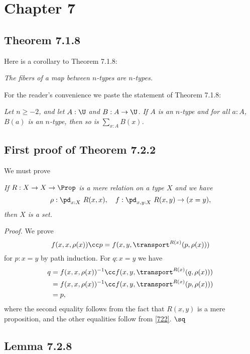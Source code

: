 \documentclass[12pt]{article}
\begin{document}

\section{Chapter 7}

\subsection{Theorem 7.1.8}\label{718}

Here is a corollary to Theorem 7.1.8: 

\emph{The fibers of a map between $n$-types are $n$-types.}

For the reader's convenience we paste the statement of Theorem 7.1.8:

\nn{} \emph{Let $n\geq-2$, and let $A:\U$ and $B:A\to\U$. If $A$ is an $n$-type and for all $a:A$, $B(a)$ is an $n$-type, then so is $\sum_{x:A}B(x)$.}


\subsection{First proof of Theorem 7.2.2}

We must prove  

\nn{} \emph{If $R:X\to X\to\Prop$ is a mere relation on a type $X$ and we have 
$$
\rho:\pd_{x:X}\ R(x,x),\quad f:\pd_{x,y:X}\ R(x,y)\to(x=y),
$$ 
then $X$ is a set.}

\nn\emph{Proof.} We prove 
\begin{equation}\label{722}
f(x,x,\rho(x))\cc p=f(x,y,\transport^{R(x)}(p,\rho(x)))
\end{equation}  
for $p:x=y$ by path induction. For $q:x=y$ we have 
\begin{align*}
q&=f(x,x,\rho(x))^{-1}\cc f(x,y,\transport^{R(x)}(q,\rho(x)))\\
&=f(x,x,\rho(x))^{-1}\cc f(x,y,\transport^{R(x)}(p,\rho(x)))\\
&=p,
\end{align*} 
where the second equality follows from the fact that $R(x,y)$ is a mere proposition, and the other equalities follow from \eqref{722}. $\sq$


\subsection{Lemma 7.2.8}
\end{document}
